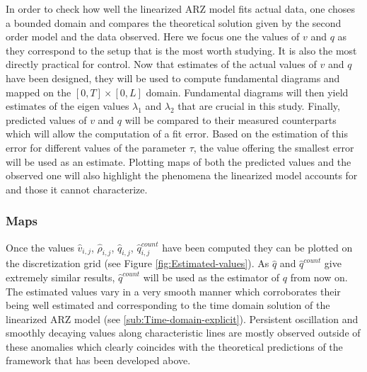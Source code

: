 \documentclass[preprint]{elsarticle}
\begin{document}
In order to check how well the linearized ARZ model fits actual data,
one choses a bounded domain and compares the theoretical solution
given by the second order model and the data observed. Here we focus
one the values of $v$ and $q$ as they correspond to the setup that
is the most worth studying. It is also the most directly practical
for control. Now that estimates of the actual values of $v$ and $q$
have been designed, they will be used to compute fundamental diagrams
and mapped on the $\left[0,T\right]\times\left[0,L\right]$ domain.
Fundamental diagrams will then yield estimates of the eigen values
$\lambda_{1}$ and $\lambda_{2}$ that are crucial in this study.
Finally, predicted values of $v$ and $q$ will be compared to their
measured counterparts which will allow the computation of a fit error.
Based on the estimation of this error for different values of the
parameter $\tau$, the value offering the smallest error will be used
as an estimate. Plotting maps of both the predicted values and the
observed one will also highlight the phenomena the linearized model
accounts for and those it cannot characterize.


\subsubsection{Maps}

Once the values $\widehat{v}_{i,j}$, $\widehat{\rho}_{i,j}$, $\widehat{q}_{i,j}$,
$\widehat{q}_{i,j}^{count}$ have been computed they can be plotted
on the discretization grid (see Figure \ref{fig:Estimated-values}).
As $\widehat{q}$ and $\widehat{q}^{count}$ give extremely similar
results, $\widehat{q}^{count}$ will be used as the estimator of $q$
from now on. The estimated values vary in a very smooth manner which
corroborates their being well estimated and corresponding to the time
domain solution of the linearized ARZ model (see \ref{sub:Time-domain-explicit}).
Persistent oscillation
and smoothly decaying values along characteristic lines are mostly
observed outside of these anomalies which clearly coincides with the
theoretical predictions of the framework that has been developed above.
\end{document}
